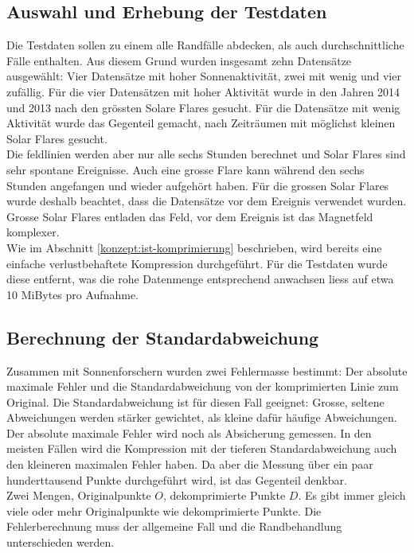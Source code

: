 \subsection{Auswahl und Erhebung der Testdaten}\label{testsetup:auswahl_erhebung}
Die Testdaten sollen zu einem alle Randfälle abdecken, als auch durchschnittliche Fälle enthalten. Aus diesem Grund wurden insgesamt zehn Datensätze ausgewählt: Vier Datensätze mit hoher Sonnenaktivität, zwei mit wenig und vier zufällig. Für die vier Datensätzen mit hoher Aktivität wurde in den Jahren 2014 und 2013 nach den grössten Solare Flares gesucht. Für die Datensätze mit wenig Aktivität wurde das Gegenteil gemacht, nach Zeiträumen mit möglichst kleinen Solar Flares gesucht.\\
Die feldlinien werden aber nur alle sechs Stunden berechnet und Solar Flares sind sehr spontane Ereignisse. Auch eine grosse Flare kann während den sechs Stunden angefangen und wieder aufgehört haben. Für die grossen Solar Flares wurde deshalb beachtet, dass die Datensätze vor dem Ereignis verwendet wurden. Grosse Solar Flares entladen das Feld, vor dem Ereignis ist das Magnetfeld komplexer.\\
[\baselineskip]
Wie im Abschnitt \ref{konzept:ist-komprimierung} beschrieben, wird bereits eine einfache verlustbehaftete Kompression durchgeführt. Für die Testdaten wurde diese entfernt, was die rohe Datenmenge entsprechend anwachsen liess auf etwa 10 MiBytes pro Aufnahme.

\subsection{Berechnung der Standardabweichung}\label{testsetup:ablauf}
Zusammen mit Sonnenforschern wurden zwei Fehlermasse bestimmt: Der absolute maximale Fehler und die Standardabweichung von der komprimierten Linie zum Original. Die Standardabweichung ist für diesen Fall geeignet: Grosse, seltene Abweichungen werden stärker gewichtet, als kleine dafür häufige Abweichungen.\\
Der absolute maximale Fehler wird noch als Absicherung gemessen. In den meisten Fällen wird die Kompression mit der tieferen Standardabweichung auch den kleineren maximalen Fehler haben. Da aber die Messung über ein paar hunderttausend Punkte durchgeführt wird, ist das Gegenteil denkbar.\\

Zwei Mengen, Originalpunkte $O$, dekomprimierte Punkte $D$. Es gibt immer gleich viele oder mehr Originalpunkte wie dekomprimierte Punkte. Die Fehlerberechnung muss der allgemeine Fall und die Randbehandlung unterschieden werden.

